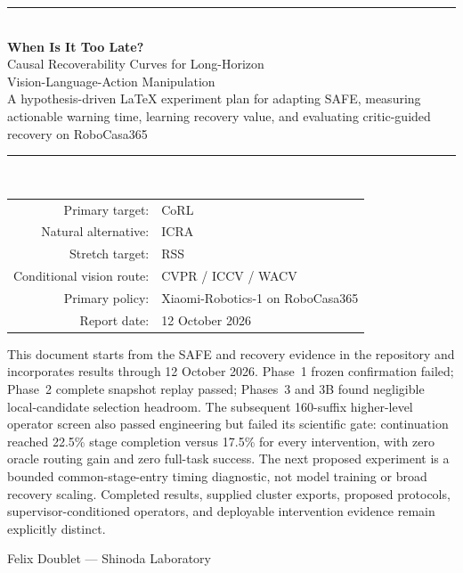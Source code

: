 \documentclass[11pt,a4paper]{article}
\begin{document}
\hypersetup{pageanchor=false}

\begin{titlepage}
\centering
\vspace*{16mm}
{\color{teal}\rule{\textwidth}{2.2pt}}\\[14mm]
{\Huge\bfseries\color{navydark} When Is It Too Late?\\[5mm]}
{\LARGE Causal Recoverability Curves for Long-Horizon\\Vision-Language-Action Manipulation}\\[14mm]
{\large\color{darkgray} A hypothesis-driven LaTeX experiment plan for adapting SAFE, measuring actionable warning time, learning recovery value, and evaluating critic-guided recovery on RoboCasa365}\\[17mm]
{\color{teal}\rule{\textwidth}{1.2pt}}\\[16mm]

\begin{tabular}{rl}
Primary target: & CoRL \\
Natural alternative: & ICRA \\
Stretch target: & RSS \\
Conditional vision route: & CVPR / ICCV / WACV \\
Primary policy: & Xiaomi-Robotics-1 on RoboCasa365 \\
Report date: & 12 October 2026 \\
\end{tabular}

\vfill
\begin{minipage}{0.9\textwidth}
\footnotesize
This document starts from the SAFE and recovery evidence in the repository and incorporates results through 12 October 2026. Phase~1 frozen confirmation failed; Phase~2 complete snapshot replay passed; Phases~3 and 3B found negligible local-candidate selection headroom. The subsequent 160-suffix higher-level operator screen also passed engineering but failed its scientific gate: continuation reached 22.5\% stage completion versus 17.5\% for every intervention, with zero oracle routing gain and zero full-task success. The next proposed experiment is a bounded common-stage-entry timing diagnostic, not model training or broad recovery scaling. Completed results, supplied cluster exports, proposed protocols, supervisor-conditioned operators, and deployable intervention evidence remain explicitly distinct.
\end{minipage}
\vfill
{\small Felix Doublet --- Shinoda Laboratory}
\end{titlepage}
\hypersetup{pageanchor=true}

\begingroup
\small
\linespread{0.96}\selectfont
\setlength{\parskip}{0pt}
\tableofcontents
\endgroup
\clearpage
{}


















\end{document}
